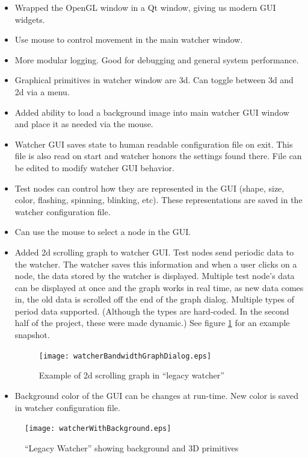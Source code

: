 \documentclass{report}
\begin{document}
\begin{itemize}
\item Wrapped the OpenGL window in a Qt window, giving us modern GUI widgets. 
\item Use mouse to control movement in the main watcher window.
\item More modular logging. Good for debugging and general system performance.
\item Graphical primitives in watcher window are 3d. Can toggle between 3d and 2d via a menu.
\item Added ability to load a background image into main watcher GUI window and place it as needed via the mouse.
\item Watcher GUI saves state to human readable configuration file on exit. This file is also read on start and watcher honors the 
settings found there. File can be edited to modify watcher GUI behavior.
\item Test nodes can control how they are represented in the GUI (shape, size, color, flashing, spinning, blinking, etc). These representations
are saved in the watcher configuration file.
\item Can use the mouse to select a node in the GUI.

\item Added 2d scrolling graph to watcher GUI. Test nodes send periodic data to the watcher. The watcher saves this information and when 
a user clicks on a node, the data stored by the watcher is displayed. Multiple test node's data can be displayed at once and the graph
works in real time, as new data comes in, the old data is scrolled off the end of the graph dialog. Multiple types of period data 
supported. (Although the types are hard-coded. In the second half of the project, these were made dynamic.) See figure \ref{fig:watcherBandwidthGraphDialog} 
for an example snapshot.

\begin{figure}[htb]
\centering
\texttt{[image: watcherBandwidthGraphDialog.eps]}
\caption{Example of 2d scrolling graph in ``legacy watcher''}
\label{fig:watcherBandwidthGraphDialog}
\end{figure}

\item Background color of the GUI can be changes at run-time. New color is saved in watcher configuration file.
\end{itemize}

\begin{figure}[htb]
\centering
\texttt{[image: watcherWithBackground.eps]}
\caption{``Legacy Watcher'' showing background and 3D primitives}
\label{fig:watcherWithBackground}
\end{figure}
\end{document}
